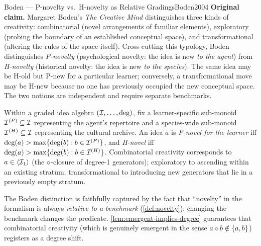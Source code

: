 \begin{zooentry}{Boden --- P-novelty vs.\ H-novelty as Relative Gradings}{Boden2004}
\textbf{Original claim.} Margaret Boden's \emph{The Creative Mind}
\cite{Boden2004} distinguishes three kinds of creativity: combinatorial
(novel arrangements of familiar elements), exploratory (probing the
boundary of an established conceptual space), and transformational
(altering the rules of the space itself). Cross-cutting this
typology, Boden distinguishes \emph{P-novelty} (psychological novelty:
the idea is new \emph{to the agent}) from \emph{H-novelty} (historical
novelty: the idea is new \emph{to the species}). The same idea may be
H-old but P-new for a particular learner; conversely, a transformational
move may be H-new because no one has previously occupied the new
conceptual space. The two notions are independent and require separate
benchmarks.

\formalclaim Within a graded idea algebra $(\mathcal{I},\dots,\deg)$, fix a
learner-specific sub-monoid $\mathcal{I}^{(P)}\subseteq \mathcal{I}$ representing
the agent's repertoire and a species-wide sub-monoid
$\mathcal{I}^{(H)}\subseteq\mathcal{I}$ representing the cultural archive. An
idea $a$ is \emph{P-novel for the learner} iff $\deg(a) > \max
\{\deg(b) : b\in\mathcal{I}^{(P)}\}$, and \emph{H-novel} iff
$\deg(a) > \max\{\deg(b) : b\in\mathcal{I}^{(H)}\}$. Combinatorial
creativity corresponds to $a\in \langle \mathcal{I}_1\rangle$ (the
$\mathbin{\diamond}$-closure of degree-1 generators); exploratory to ascending
within an existing stratum; transformational to introducing new
generators that lie in a previously empty stratum.

\formalstatus The Boden distinction is faithfully captured by the fact
that ``novelty'' in the formalism is always \emph{relative to a
benchmark} (\cref{def:novelty}); changing the benchmark changes the
predicate. \cref{lem:emergent-implies-degree} guarantees that
combinatorial creativity (which is genuinely emergent in the sense
$a\mathbin{\diamond} b\notin\{a,b\}$) registers as a degree shift.


\end{zooentry}
